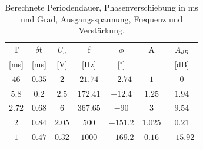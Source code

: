\documentclass[12pt,a4paper,ngerman]{article}
\begin{document}
\begin{table}[H]
\begin{center}
\begin{tabular}{ |c|c|c|c|c|c|c| }
  \hline
    T & $\delta$t & $U_a$ & f & $\phi$ & A & $A_{dB}$\\

    [ms] & [ms] & [V] & [Hz] & [$^\circ$] & & [dB]\\
  \hline
$46$ & $0.35$ & $2$ & $21.74$ & $-2.74$ & $1$ & $0$\\
  \hline
$5.8$ & $0.2$ & $2.5$ & $172.41$ & $-12.4$ & $1.25$ & $1.94$\\
  \hline
$2.72$ & $0.68$ & $6$ & $367.65$ & $-90$ & $3$ & $9.54$\\
  \hline
$2$ & $0.84$ & $2.05$ & $500$ & $-151.2$ & $1.025$ & $0.21$\\
  \hline
$1$ & $0.47$ & $0.32$ & $1000$ & $-169.2$ & $0.16$ & $-15.92$\\
  \hline
\end{tabular}
\caption{Berechnete Periodendauer, Phasenverschiebung in ms und Grad, Ausgangsspannung, Frequenz und Verstärkung.}
\end{center}
\label{tab:1_ber}
\end{table}
\end{document}
